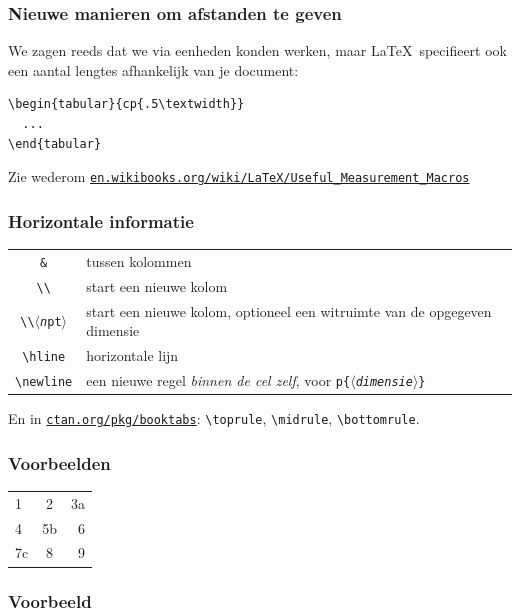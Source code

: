 \begin{frame}[fragile]
  \frametitle{Nieuwe manieren om afstanden te geven}

  We zagen reeds dat we via eenheden konden werken, maar \LaTeX\ specifieert ook een aantal lengtes afhankelijk van je document:
  \begin{verbatim}
\begin{tabular}{cp{.5\textwidth}}
  ...
\end{tabular}
  \end{verbatim}

  Zie wederom \href{http://en.wikibooks.org/wiki/LaTeX/Useful_Measurement_Macros}{\texttt{en.wikibooks.org/wiki/LaTeX/Useful\_Measurement\_Macros}}
\end{frame}

\begin{frame}[fragile]
  \frametitle{Horizontale informatie}

  \begin{tabular}{cp{}}
    \texttt{\&} & tussen kolommen \\
    \texttt{\textbackslash\textbackslash} & start een nieuwe kolom \\
    \texttt{\textbackslash\textbackslash$\langle$\textsl{n}pt$\rangle$} & start een nieuwe kolom, optioneel een witruimte van de opgegeven dimensie \\
    \texttt{\textbackslash hline} & horizontale lijn \\
    \texttt{\textbackslash newline} & een nieuwe regel \emph{binnen de cel zelf}, voor \texttt{p\{$\langle$\textsl{dimensie}$\rangle$\}}
  \end{tabular} 

  En in \href{http://ctan.org/pkg/booktabs}{\texttt{ctan.org/pkg/booktabs}}: \verb|\toprule|, \verb|\midrule|, \verb|\bottomrule|.
\end{frame}

\begin{frame}[fragile]
  \frametitle{Voorbeelden}

  \begin{LTXexample}
\begin{tabular}{lcr}
  1 & 2 & 3a \\
  4 & 5b & 6 \\
  7c & 8 & 9
\end{tabular} 
  \end{LTXexample}
\end{frame}

\begin{frame}[fragile]
  \frametitle{Voorbeeld}

  \inputminted{tex}{table-example.tex}
\end{frame}

